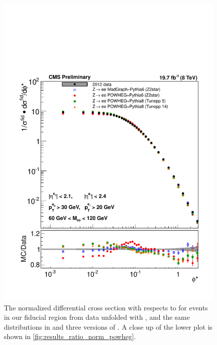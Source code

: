 \begin{figure}[!p]
    \centering
    \includegraphics[width=\textwidth]{figures/ZShape_elec_PH_Norm_Dressed.pdf}
    \caption[
        The normalized differential cross section with respects to \phistar for
        \Ztoee events in our fiducial region from data unfolded with
        \PPsixZtwo.
    ]{
        The normalized differential cross section with respects to \phistar for
        \Ztoee events in our fiducial region from data unfolded with
        \PPsixZtwo, and the same distributions in \MADGRAPH and three versions
        of \POWHEG. A close up of the lower plot is shown in
        \cref{fig:results_ratio_norm_powheg}.
    }
    \label{fig:results_norm_powheg}
\end{figure}

